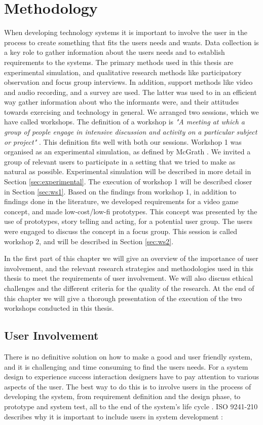 \chapter{Methodology}
When developing technology systems it is important to involve the user in the process to create something that fits the users needs and wants. Data collection is a key role to gather information about the users needs and to establish requirements to the systems. The primary methods used in this thesis are experimental simulation, and qualitative research methods like participatory observation and focus group interviews. In addition, support methods like video and audio recording, and a survey are used. The latter was used to in an efficient way gather information about  who the informants were, and their attitudes towards exercising and technology in general. We arranged two sessions, which we have called workshops.  The definition of a workshop is \emph{"A meeting at which a group of people engage in intensive discussion and activity on a particular subject or project"} \cite{dictionary}. This definition fits well with both our sessions. Workshop 1 was organised as an experimental simulation, as defined by McGrath \cite{McGrath}. We invited a group of relevant users to participate in a setting that we tried to make as natural as possible. Experimental simulation will be described in more detail in Section \ref{sec:experimental}. The execution of workshop 1 will be described closer in Section \ref{sec:ws1}. Based on the findings from workshop 1, in addition to findings done in the literature, we developed requirements for a video game concept, and made low-cost/low-fi prototypes. This concept was presented by the use of prototypes, story telling and acting, for a potential user group. The users were engaged to discuss the concept in a focus group. This session is called workshop 2, and will be described in Section \ref{sec:ws2}. 

In the first part of this chapter we will give an overview of the importance of user involvement, and the relevant research strategies and methodologies used in this thesis to meet the requirements of user involvement. We will also discuss ethical challenges and the different criteria for the quality of the research. At the end of this chapter we will give a thorough presentation of the execution of the two workshops conducted in this thesis. 

\section{User Involvement}
There is no definitive solution on how to make a good and user friendly system, and it is challenging and time consuming to find the users needs. For a system design to experience success interaction designers have to pay attention to various aspects of the user. The best way to do this is to involve users in the process of developing the system, from requirement definition and the design phase, to prototype and system test, all to the end of the system's life cycle \cite{mmi}. ISO 9241-210 describes why it is important to include users in system development \cite{dis20109241}:


